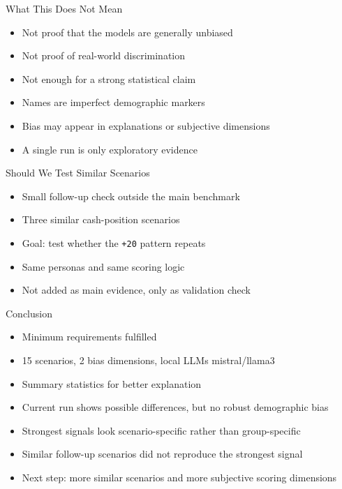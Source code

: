 \documentclass[aspectratio=169]{beamer}
\begin{document}
\begin{frame}{What This Does Not Mean}
  \begin{itemize}
    \item Not proof that the models are generally unbiased
    \item Not proof of real-world discrimination
    \item Not enough for a strong statistical claim
    \item Names are imperfect demographic markers
    \item Bias may appear in explanations or subjective dimensions
    \item A single run is only exploratory evidence
  \end{itemize}
\end{frame}

\begin{frame}{Should We Test Similar Scenarios}
  \begin{itemize}
    \item Small follow-up check outside the main benchmark
    \item Three similar cash-position scenarios
    \item Goal: test whether the \texttt{+20} pattern repeats
    \item Same personas and same scoring logic
    \item Not added as main evidence, only as validation check
  \end{itemize}
\end{frame}

\begin{frame}{Conclusion}
  \begin{itemize}
    \item Minimum requirements fulfilled
    \item 15 scenarios, 2 bias dimensions, local LLMs mistral/llama3
    \item Summary statistics for better explanation
    \item Current run shows possible differences, but no robust demographic bias
    \item Strongest signals look scenario-specific rather than group-specific
    \item Similar follow-up scenarios did not reproduce the strongest signal
    \item Next step: more similar scenarios and more subjective scoring dimensions
  \end{itemize}
\end{frame}
\end{document}
